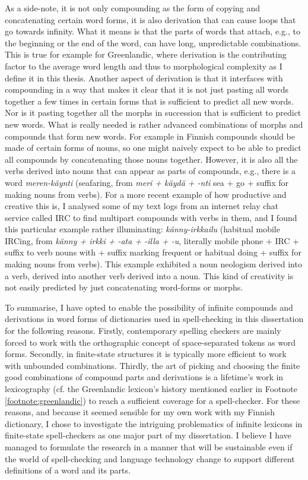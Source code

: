 \documentclass[officiallayout,final]{unihelcompling}
\begin{document}
As a side-note, it is not only compounding as the form of copying and
concatenating certain word forms, it is also derivation that can cause loops
that go towards infinity. What it means is that the parts of words that attach,
e.g., to the beginning or the end of the word, can have long, unpredictable
combinations. This is true for example for Greenlandic, where derivation is the
contributing factor to the average word length and thus to \gls{morphological
complexity} as I define it in this thesis.  Another aspect of derivation is
that it interfaces with compounding in a way that makes it clear that it is not
just pasting all words together a few times in certain forms that is sufficient
to predict all new words. Nor is it pasting together all the morphs in
succession that is sufficient to predict new words. What is really needed is
rather advanced combinations of morphs and compounds that form new words. For
example in Finnish compounds should be made of certain forms of nouns, so one
might naively expect to be able to predict all compounds by concatenating those
nouns together. However, it is also all the verbs derived into nouns that can
appear as parts of compounds, e.g., there is a word \emph{meren-käynti}
(seafaring, from \emph{meri + käydä + -nti} sea + go + suffix for making nouns
from verbs).  For a more recent example of how productive and creative this is,
I analysed some of my text logs from an internet relay chat service called IRC
to find multipart compounds with verbs in them, and I found this particular
example rather illuminating: \emph{känny-irkkailu} (habitual mobile IRCing,
from \emph{känny + irkki + -ata + -illa + -u}, literally mobile phone + IRC +
suffix to verb nouns with + suffix marking frequent or habitual doing + suffix
for making nouns from verbs). This example exhibited a noun neologism derived
into a verb, derived into another verb derived into a noun.  This kind of
creativity is not easily predicted by just concatenating word-forms or morphs.

To summarise, I have opted to enable the possibility of infinite compounds and
derivations in word forms of dictionaries used in spell-checking in this
dissertation for the following reasons. Firstly, contemporary spelling checkers
are mainly forced to work with the orthographic concept of space-separated
tokens as word forms. Secondly, in finite-state structures it is typically more
efficient to work with unbounded combinations.  Thirdly, the art of picking and
choosing the finite good combinations of compound parts and derivations is
a lifetime's work in lexicography (cf. the Greenlandic lexicon's history
mentioned earlier in Footnote \ref{footnote:greenlandic}) to reach a sufficient
coverage for a spell-checker.  For these reasons, and because it seemed
sensible for my own work with my Finnish dictionary, I chose to investigate the
intriguing problematics of infinite lexicons in finite-state spell-checkers as
one major part of my dissertation. I believe I have managed to formulate the
research in a manner that will be sustainable even if the world of
spell-checking and language technology change to support different definitions
of a word and its parts.
\end{document}
